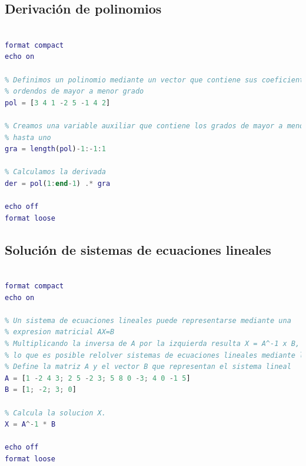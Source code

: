 \subsection{Derivación de polinomios}
\begin{lstlisting}[language=Matlab]
% Ejercicio 16. Derivacion de polinomios

format compact
echo on

% Definimos un polinomio mediante un vector que contiene sus coeficientes
% ordendos de mayor a menor grado
pol = [3 4 1 -2 5 -1 4 2]

% Creamos una variable auxiliar que contiene los grados de mayor a menor
% hasta uno
gra = length(pol)-1:-1:1

% Calculamos la derivada
der = pol(1:end-1) .* gra

echo off
format loose
\end{lstlisting}



\subsection{Solución de sistemas de ecuaciones lineales}
\begin{lstlisting}[language=Matlab]
% Ejercicio 17. Solucion de sistemas de ecuaciones lineales

format compact
echo on

% Un sistema de ecuaciones lineales puede representarse mediante una
% expresion matricial AX=B
% Multiplicando la inversa de A por la izquierda resulta X = A^-1 x B, por
% lo que es posible relolver sistemas de ecuaciones lineales mediante la ultima expresion.
% Define la matriz A y el vector B que representan el sistema lineal
A = [1 -2 4 3; 2 5 -2 3; 5 8 0 -3; 4 0 -1 5]
B = [1; -2; 3; 0]

% Calcula la solucion X.
X = A^-1 * B

echo off
format loose
\end{lstlisting}



